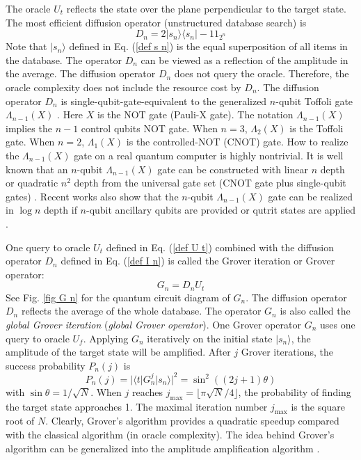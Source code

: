 \documentclass[%
 twocolumn,
 10pt,
 superscriptaddress,
 longbibliography,
 amsmath,amssymb,
 aps,
 pra,
floatfix,
]{revtex4-1}
\begin{document}
The oracle $U_t$ reflects the state over the plane perpendicular to the target state. The most efficient diffusion operator (unstructured database search) is
\begin{equation}
\label{def I n}
D_n = 2|s_n\rangle\langle s_n|-1\!\!1_{2^n}
\end{equation}
Note that $|s_n\rangle$ defined in Eq. (\ref{def s n}) is the equal superposition of all items in the  database. The operator $D_n$ can be viewed as a reflection of the amplitude in the average. The diffusion operator $D_n$ does not query the oracle. Therefore, the oracle complexity does not include the resource cost by $D_n$. The diffusion operator $D_n$ is single-qubit-gate-equivalent to the generalized $n$-qubit Toffoli gate $\Lambda_{n-1}(X)$ \cite{NC10}. Here $X$ is the NOT gate (Pauli-X gate). The notation $\Lambda_{n-1}(X)$ implies the $n-1$ control qubits NOT gate. When $n=3$, $\Lambda_{2}(X)$ is the Toffoli gate. When $n=2$, $\Lambda_{1}(X)$ is the controlled-NOT (CNOT) gate. How to realize the $\Lambda_{n-1}(X)$ gate on a real quantum computer is highly nontrivial. It is well known that an $n$-qubit $\Lambda_{n-1}(X)$ gate can be constructed with linear $n$ depth or quadratic $n^2$ depth from the universal gate set (CNOT gate plus single-qubit gates) \cite{BBCDMSSSW95}. Recent works also show that the $n$-qubit $\Lambda_{n-1}(X)$ gate can be realized in $\log n$ depth if $n$-qubit ancillary qubits are provided \cite{HLZWW17} or qutrit states are applied \cite{GBDBRC19}. 

One query to oracle $U_t$ defined in Eq. (\ref{def U t}) combined with the diffusion operator $D_n$ defined in Eq. (\ref{def I n}) is called the Grover iteration or Grover operator:
\begin{equation}
\label{def G n}
G_n =  D_n U_t
\end{equation}
See Fig. \ref{fig G n} for the quantum circuit diagram of $G_n$. The diffusion operator $D_n$ reflects the average of the whole database. The operator $G_n$ is also called the {\it global Grover iteration} ({\it global Grover operator}). One Grover operator $G_n$ uses one query to oracle $U_f$. Applying $G_n$ iteratively on the initial state $|s_n\rangle$, the amplitude of the target state will be amplified. After $j$ Grover iterations, the success probability $P_n(j)$ is
\begin{equation}
\label{def P n}
P_n(j) = |\langle t|G_n^j|s_n\rangle|^2 = \sin^2((2j+1)\theta)  
\end{equation}
with $\sin\theta=1/\sqrt N$. When $j$ reaches $j_\text{max}=\lfloor \pi\sqrt N/4\rfloor$, the probability of finding the target state approaches 1. The maximal iteration number $j_\text{max}$ is the square root of $N$. Clearly, Grover's algorithm provides a quadratic speedup compared with the classical algorithm (in oracle complexity). The idea behind Grover's algorithm can be generalized into the amplitude amplification algorithm \cite{BHMT00}.
\end{document}
